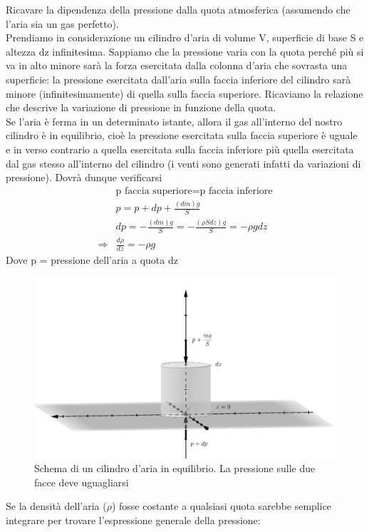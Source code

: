 \documentclass[
10pt, %
a4paper, %
oneside, %
headinclude,footinclude, %
BCOR5mm, %
]{scrartcl}
\begin{document}
\begin{exercise}\label{ex:pressione_quota}
	Ricavare la dipendenza della pressione dalla quota atmosferica (assumendo che l’aria sia un gas perfetto).\\
	Prendiamo in considerazione un cilindro d'aria di volume V, superficie di base S e altezza dz infinitesima. Sappiamo che la pressione varia con la quota perché più si va in alto minore sarà la forza esercitata dalla colonna d'aria che sovrasta una superficie: la pressione esercitata dall'aria sulla faccia inferiore del cilindro sarà minore (infinitesimamente) di quella sulla faccia superiore. Ricaviamo la relazione che descrive la variazione di pressione in funzione della quota.\\
	Se l'aria è ferma in un determinato istante, allora il gas all'interno del nostro cilindro è in equilibrio, cioè la pressione esercitata sulla faccia superiore è uguale e in verso contrario a quella esercitata sulla faccia inferiore più quella esercitata dal gas stesso all'interno del cilindro (i venti sono generati infatti da variazioni di pressione). Dovrà dunque verificarsi
	\begin{align}\label{eq:stevin}
		&\text{p faccia superiore} = \text{p faccia inferiore}\nonumber\\
		&p  = p + dp \nonumber + \frac{(dm) g}{S}\nonumber\\
		&dp = -\frac{(dm)g}{S} = -\frac{(\rho S dz) g}{S}= -\rho g dz \nonumber \\
		\Rightarrow & \frac{d\rho}{dz}= - \rho g
	\end{align} 
	Dove p = pressione dell'aria a quota dz
	\begin{figure}[h!]
		\centering
		\includegraphics[width=0.5\linewidth]{../images/cilindro_aria}
		\caption{Schema di un cilindro d'aria in equilibrio. La pressione sulle due facce deve uguagliarsi}
		\label{fig:cilindroaria}
	\end{figure}
	\FloatBarrier
	Se la densità dell'aria ($\rho$) fosse costante a qualsiasi quota sarebbe semplice integrare per trovare l'espressione generale della pressione:
	\begin{align*} 

\end{align*}
\end{exercise}
\end{document}
